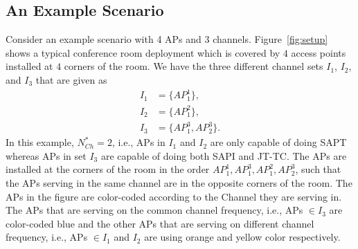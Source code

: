 \subsection {An Example Scenario}
\label{subsec:an_example_scenario}
\label{example_scenario}
Consider an example scenario with 4 APs and 3 channels. Figure~\ref{fig:setup} shows a typical conference room deployment which is covered by $4$ access points installed at $4$ corners of the room. We have the three different channel sets $I_1$, $I_2$, and $I_3$ that are given as
\begin{align*}
    I_1 &= \{AP_1^1\},
    \\
    I_2 &= \{AP_1^2\},
    \\
    I_3 &= \{AP_1^3, AP_2^3\}.
\end{align*}
In this example, $N_{Ch}^* = 2$, i.e., APs in $I_1$ and $I_2$ are only capable of doing SAPT whereas APs in set $I_3$ are capable of doing both SAPI and JT-TC. The APs are installed at the corners of the room in the order $AP_1^1, AP_1^3, AP_1^2, AP_2^3$, such that the APs serving in the same channel are in the opposite corners of the room. The APs in the figure are color-coded according to the Channel they are serving in. The APs that are serving on the common channel frequency, i.e., APs $\in I_3$ are color-coded blue and the other APs that are serving on different channel frequency, i.e., APs $\in I_1$ and $I_2$ are using orange and yellow color respectively.

